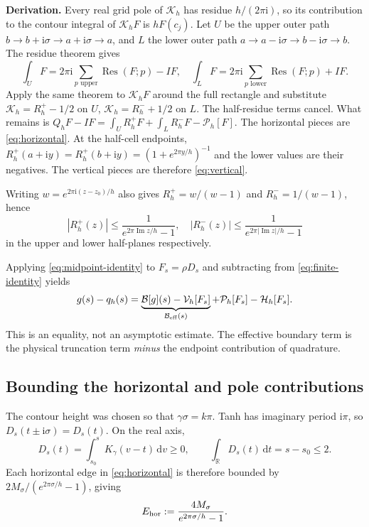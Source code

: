 \documentclass[11pt]{article}
\newcommand{\R}{\mathbb R}
\newcommand{\ii}{\mathrm i}
\newcommand{\dd}{\,\mathrm d}
\newcommand{\Res}{\operatorname{Res}}
\newcommand{\Imag}{\operatorname{Im}}
\begin{document}
\textbf{Derivation.} Every real grid pole of $\mathcal K_h$ has residue $h/(2\pi\ii)$, so its contribution to the contour integral of $\mathcal K_hF$ is $hF(c_j)$. Let $U$ be the upper outer path $b\to b+\ii\sigma\to a+\ii\sigma\to a$, and $L$ the lower outer path $a\to a-\ii\sigma\to b-\ii\sigma\to b$. The residue theorem gives
\[
 \int_U F=2\pi\ii\sum_{p\text{ upper}}\Res(F;p)-IF,
 \quad
 \int_L F=2\pi\ii\sum_{p\text{ lower}}\Res(F;p)+IF.
\]
Apply the same theorem to $\mathcal K_hF$ around the full rectangle and substitute $\mathcal K_h=R_h^+-1/2$ on $U$, $\mathcal K_h=R_h^-+1/2$ on $L$. The half-residue terms cancel. What remains is $Q_hF-IF=\int_U R_h^+F+\int_L R_h^-F-\mathcal P_h[F]$. The horizontal pieces are \eqref{eq:horizontal}. At the half-cell endpoints,
$R_h^+(a+\ii y)=R_h^+(b+\ii y)=(1+e^{2\pi y/h})^{-1}$ and the lower values are their negatives. The vertical pieces are therefore \eqref{eq:vertical}.

Writing $w=e^{2\pi\ii(z-z_0)/h}$ also gives $R_h^+=w/(w-1)$ and $R_h^-=1/(w-1)$, hence
\begin{equation}
 |R_h^+(z)|\le\frac1{e^{2\pi\Imag z/h}-1},\quad
 |R_h^-(z)|\le\frac1{e^{2\pi|\Imag z|/h}-1}
 \label{eq:contour-weight-bound}
\end{equation}
in the upper and lower half-planes respectively.

Applying \eqref{eq:midpoint-identity} to $F_s=\rho D_s$ and subtracting from \eqref{eq:finite-identity} yields
\begin{equation}
 g(s)-q_h(s)=
 \underbrace{\mathcal B[g](s)-\mathcal V_h[F_s]}_{\mathcal B_{\rm eff}(s)}
 +\mathcal P_h[F_s]-\mathcal H_h[F_s].
 \label{eq:exact-baseline-error}
\end{equation}
This is an equality, not an asymptotic estimate. The effective boundary term is the physical truncation term \emph{minus} the endpoint contribution of quadrature.

\subsection{Bounding the horizontal and pole contributions}

The contour height was chosen so that $\gamma\sigma=k\pi$. Tanh has imaginary period $\ii\pi$, so $D_s(t\pm\ii\sigma)=D_s(t)$. On the real axis,
\[
 D_s(t)=\int_{s_0}^s K_\gamma(v-t)\dd v\ge0,
 \qquad \int_\R D_s(t)\dd t=s-s_0\le2.
\]
Each horizontal edge in \eqref{eq:horizontal} is therefore bounded by
$2M_\sigma/(e^{2\pi\sigma/h}-1)$, giving
\begin{equation}
 E_{\rm hor}:=\frac{4M_\sigma}{e^{2\pi\sigma/h}-1}.
 \label{eq:exact-h-bound}
\end{equation}
\end{document}
